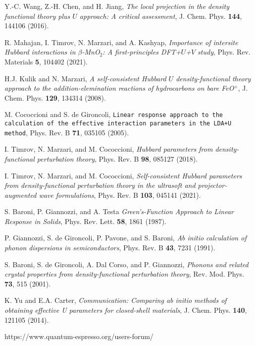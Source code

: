 \documentclass[12pt,a4paper]{article}
\begin{document}
\begin{thebibliography}{100}
   Y.-C. Wang, Z.-H. Chen, and H. Jiang, \textit{The local projection in the density functional theory plus $U$ approach: A critical assessment}, J. Chem. Phys. {\bf 144}, 144106 (2016).
  
   R. Mahajan, I. Timrov, N. Marzari, and A. Kashyap, \textit{Importance of intersite Hubbard interactions in $\beta$-MnO$_2$: A first-principles DFT+$U$+$V$ study}, Phys. Rev. Materials {\bf 5}, 104402 (2021).
  
   H.J. Kulik and N. Marzari, \textit{A self-consistent Hubbard $U$ density-functional theory approach to the addition-elemination reactions of hydrocarbons on bare FeO$^+$}, J. Chem. Phys. {\bf 129}, 134314 (2008).
  
   M. Cococcioni and S. de Gironcoli, \texttt{Linear response approach to the calculation of the effective interaction parameters in the LDA+U method}, Phys. Rev. B {\bf 71}, 035105 (2005).
  
   I. Timrov, N. Marzari, and M. Cococcioni, \textit{Hubbard parameters from density-functional perturbation theory}, Phys. Rev. B {\bf 98}, 085127 (2018).
  
   I. Timrov, N. Marzari, and M. Cococcioni, \textit{Self-consistent Hubbard parameters from density-functional perturbation theory in the ultrasoft and projector-augmented wave formulations}, Phys. Rev. B {\bf 103}, 045141 (2021).
  
   S. Baroni, P. Giannozzi, and A. Testa \textit{Green's-Function Approach to Linear Response in Solids}, Phys. Rev. Lett. {\bf 58}, 1861 (1987).
  
   P. Giannozzi, S. de Gironcoli, P. Pavone, and S. Baroni, \textit{Ab initio calculation of phonon dispersions in semiconductors}, Phys. Rev. B {\bf 43}, 7231 (1991).
  
   S. Baroni, S. de Gironcoli, A. Dal Corso, and P. Giannozzi, \textit{Phonons and related crystal properties from density-functional perturbation theory}, Rev. Mod. Phys. {\bf 73}, 515 (2001).
  
   K. Yu and E.A. Carter, \textit{Communication: Comparing ab initio methods of obtaining effective U parameters for closed-shell materials}, J. Chem. Phys. {\bf 140}, 121105 (2014).
  
   https://www.quantum-espresso.org/users-forum/
  
\end{thebibliography}
\end{document}
